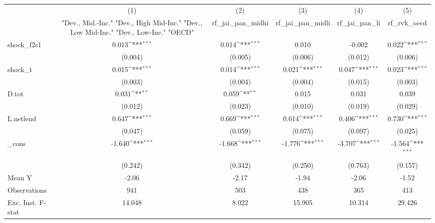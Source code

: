 {
\def\sym#1{\ifmmode^{#1}\else\(^{#1}\)\fi}
\begin{tabular}{l*{5}{c}}
\toprule
            &\multicolumn{1}{c}{(1)}&\multicolumn{1}{c}{(2)}&\multicolumn{1}{c}{(3)}&\multicolumn{1}{c}{(4)}&\multicolumn{1}{c}{(5)}\\
            &\multicolumn{1}{c}{ "Dev., Mid.-Inc." "Dev., High Mid-Inc." "Dev., Low Mid-Inc." "Dev., Low-Inc." "OECD" }&\multicolumn{1}{c}{rf\_jai\_pan\_midhi}&\multicolumn{1}{c}{rf\_jai\_pan\_midli}&\multicolumn{1}{c}{rf\_jai\_pan\_li}&\multicolumn{1}{c}{rf\_rvk\_oecd}\\
\midrule
shock\_f2s1  &       0.013\sym{***}&       0.014\sym{***}&       0.010         &      -0.002         &       0.022\sym{***}\\
            &     (0.004)         &     (0.005)         &     (0.006)         &     (0.012)         &     (0.006)         \\
\addlinespace
shock\_t     &       0.015\sym{***}&       0.014\sym{***}&       0.021\sym{***}&       0.047\sym{***}&       0.023\sym{***}\\
            &     (0.003)         &     (0.004)         &     (0.004)         &     (0.015)         &     (0.003)         \\
\addlinespace
D.tot       &       0.031\sym{**} &       0.059\sym{**} &       0.015         &       0.031         &       0.039         \\
            &     (0.012)         &     (0.023)         &     (0.010)         &     (0.019)         &     (0.029)         \\
\addlinespace
L.netlend   &       0.647\sym{***}&       0.669\sym{***}&       0.614\sym{***}&       0.406\sym{***}&       0.730\sym{***}\\
            &     (0.047)         &     (0.059)         &     (0.075)         &     (0.097)         &     (0.025)         \\
\addlinespace
\_cons      &      -1.640\sym{***}&      -1.668\sym{***}&      -1.776\sym{***}&      -3.707\sym{***}&      -1.564\sym{***}\\
            &     (0.242)         &     (0.342)         &     (0.250)         &     (0.763)         &     (0.157)         \\
\midrule
Mean Y      &       -2.06         &       -2.17         &       -1.94         &       -2.06         &       -1.52         \\
Observations&         941         &         503         &         438         &         365         &         413         \\
Exc. Inst. F-stat&      14.048         &       8.022         &      15.905         &      10.314         &      29.426         \\
\bottomrule
\end{tabular}
}
